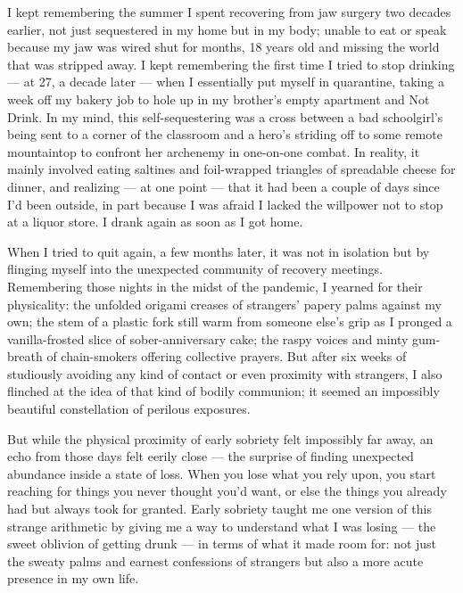 I kept remembering the summer I spent recovering from jaw surgery two
decades earlier, not just sequestered in my home but in my body; unable
to eat or speak because my jaw was wired shut for months, 18 years old
and missing the world that was stripped away. I kept remembering the
first time I tried to stop drinking --- at 27, a decade later --- when I
essentially put myself in quarantine, taking a week off my bakery job to
hole up in my brother's empty apartment and Not Drink. In my mind, this
self-sequestering was a cross between a bad schoolgirl's being sent to a
corner of the classroom and a hero's striding off to some remote
mountaintop to confront her archenemy in one-on-one combat. In reality,
it mainly involved eating saltines and foil-wrapped triangles of
spreadable cheese for dinner, and realizing --- at one point --- that it
had been a couple of days since I'd been outside, in part because I was
afraid I lacked the willpower not to stop at a liquor store. I drank
again as soon as I got home.

When I tried to quit again, a few months later, it was not in isolation
but by flinging myself into the unexpected community of recovery
meetings. Remembering those nights in the midst of the pandemic, I
yearned for their physicality: the unfolded origami creases of
strangers' papery palms against my own; the stem of a plastic fork still
warm from someone else's grip as I pronged a vanilla-frosted slice of
sober-anniversary cake; the raspy voices and minty gum-breath of
chain-smokers offering collective prayers. But after six weeks of
studiously avoiding any kind of contact or even proximity with
strangers, I also flinched at the idea of that kind of bodily communion;
it seemed an impossibly beautiful constellation of perilous exposures.

But while the physical proximity of early sobriety felt impossibly far
away, an echo from those days felt eerily close --- the surprise of
finding unexpected abundance inside a state of loss. When you lose what
you rely upon, you start reaching for things you never thought you'd
want, or else the things you already had but always took for granted.
Early sobriety taught me one version of this strange arithmetic by
giving me a way to understand what I was losing --- the sweet oblivion
of getting drunk --- in terms of what it made room for: not just the
sweaty palms and earnest confessions of strangers but also a more acute
presence in my own life.

